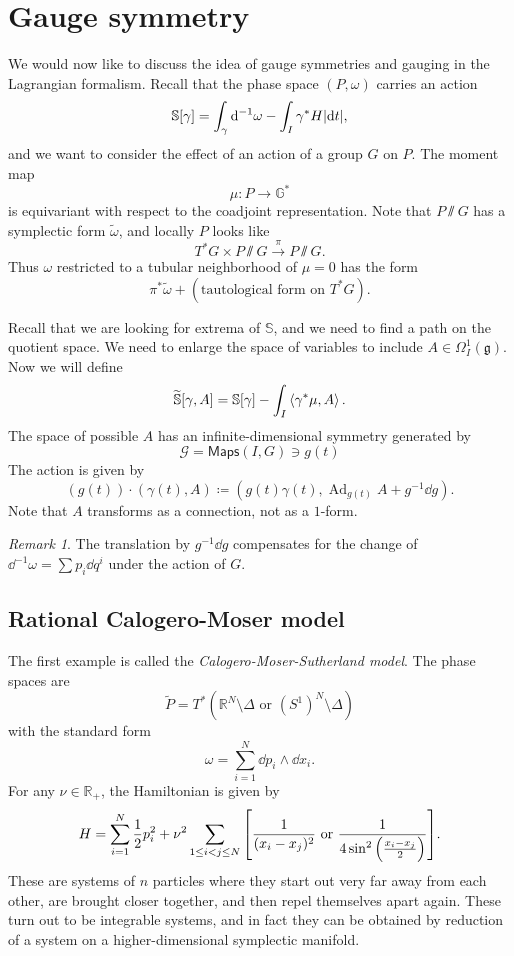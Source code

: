 \documentclass[leqno, openany]{memoir}
\theoremstyle{definition}
\theoremstyle{remark}
\newtheorem{rmk}[thm]{Remark}
\theoremstyle{plain}
\theoremstyle{definition}
\theoremstyle{remark}
\newcommand{\G}{\mathbb{G}}
\newcommand{\R}{\mathbb{R}}
\newcommand{\g}{\mathfrak{g}}
\newcommand{\mc}[1]{\mathcal{#1}}
\newcommand{\ms}[1]{\mathsf{#1}}
\newcommand{\on}[1]{\operatorname{#1}}
\newcommand{\wt}[1]{\widetilde{#1}}
\begin{document}
\section{Gauge symmetry}
\label{sec:gauge}

We would now like to discuss the idea of gauge symmetries and gauging in the Lagrangian formalism. Recall that the phase space $(P, \omega)$ carries an action
\[ \mathbb{S}[\gamma] = \int_{\gamma} \dd^{-1} \omega - \int_I \gamma^* H \abs{\dd{t}}, \]
and we want to consider the effect of an action of a group $G$ on $P$. The moment map
\[ \mu \colon P \to \G^* \]
is equivariant with respect to the coadjoint representation. Note that $P\sslash G$ has a symplectic form $\wt{\omega}$, and locally $P$ looks like
\[ T^* G \times P \sslash G \xrightarrow{\pi} P\sslash G. \]
Thus $\omega$ restricted to a tubular neighborhood of $\mu = 0$ has the form
\[ \pi^* \wt{\omega} + (\text{tautological form on } T^*G). \]

Recall that we are looking for extrema of $\mathbb{S}$, and we need to find a path on the quotient space. We need to enlarge the space of variables to include $A \in \Omega^1_I(\g)$. Now we will define
\[ \wt{\mathbb{S}}[\gamma, A] = \mathbb{S}[\gamma] - \int_I \ev{\gamma^* \mu, A}. \]
The space of possible $A$ has an infinite-dimensional symmetry generated by
\[ \mc{G} = \ms{Maps}(I, G) \ni g(t) \]
The action is given by
\[ (g(t)) \cdot (\gamma(t), A) \coloneqq (g(t) \gamma(t), \on{Ad}_{g(t)}A + g^{-1} \dd{g}). \]
Note that $A$ transforms as a connection, not as a $1$-form.

\begin{rmk}
The translation by $g^{-1} \dd{g}$ compensates for the change of $\dd^{-1} \omega = \sum p_i \dd{q^i}$ under the action of $G$.
\end{rmk}

\subsection{Rational Calogero-Moser model}
\label{sub:ratlcms}

The first example is called the \textit{Calogero-Moser-Sutherland model}. The phase spaces are
\[ \wt{P} = T^* (\R^N \setminus \Delta \text{ or } (S^1)^N \setminus \Delta )\]
with the standard form
\[ \omega = \sum_{i=1}^N \dd{p_i} \wedge \dd{x_i}. \]
For any $\nu \in \R_+$, the Hamiltonian is given by
\[ H = \sum_{i=1}^N \frac{1}{2} p_i^2 + \nu^2 \sum_{1 \leq i < j \leq N} \qty[\frac{1}{(x_i-x_j)^2} \text{ or }\frac{1}{4\sin^2\qty(\frac{x_i-x_j}{2})} ]. \]
These are systems of $n$ particles where they start out very far away from each other, are brought closer together, and then repel themselves apart again. These turn out to be integrable systems, and in fact they can be obtained by reduction of a system on a higher-dimensional symplectic manifold.
\end{document}
